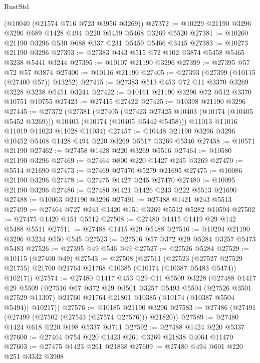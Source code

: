 \begin{lexlean}{RustStd}
\begin{coremodule}
    (@10040 (@21574 @716 @723 @3956 @3269))
@27372 := @10229 @21190 @3296 @3296 @689 @1428 @494 @220 @5459 @5468 @3269 @5520
@27381 := @10260 @21190 @3296 @530 @688 @337 @231 @5459 @5466 @3445
@27383 := @10273 @21190 @3296
@27393 := @27383 @443 @515 @72 @102 @3874 @5458 @5465 @3238 @5441 @3244
@27395 := @10107 @21190 @3296
@27399 := @27395 @57 @72 @57 @3874
@27400 := @10116 @21190
@27405 := @27393 (@27399 (@10115 (@27400 @57)) @13252)
@27415 := @27383 @513 @453 @72 @11 @3370 @3269 @3228 @3238 @5451 @3244
@27422 := @10161 @21190 @3296 @72 @512 @3370 @10751 @10755
@27423 := @27415 @27422
@27425 := @10398 @21190 @3296
@27445 := @27372
    (@27381
      (@27405
        (@27423 @27425 @10403 (@10174 (@10405 @5452 @3269)))
        @10403
        (@10174 (@10405 @5442 @5458)))
      @11013
      @11016
      @11019
      @11023
      @11028
      @11034)
@27457 := @10448 @21190 @3296 @3296 @10452 @5468 @1428 @494 @220 @3269 @5517 @3269 @5346
@27458 := @10571 @21190
@27462 := @27458 @1428 @220 @3269 @5516
@27464 := @10580 @21190 @3296
@27469 := @27464 @800 @220 @1427 @245 @3269
@27470 := @5514 @21690
@27473 := @27469 @27470 @5279 @21695
@27475 := @10086 @21190 @3296
@27478 := @27475 @1427 @245 @27470
@27480 := @10095 @21190 @3296
@27486 := @27480 @1421 @1426 @243 @222 @5513 @21690
@27488 := @10063 @21190 @3296
@27491 := @27488 @1421 @243 @5513
@27499 := @27464 @727 @243 @1420 @151 @3269 @5512 @5282 @10594
@27502 := @27475 @1420 @151 @5512
@27508 := @27480 @1415 @1419 @29 @142 @5488 @5511
@27511 := @27488 @1415 @29 @5488
@27516 := @10294 @21190 @3296 @3234 @550 @545
@27523 := @27516 @57 @372 @29 @5284 @3257 @5473 @5483
@27526 := @27395 @49 @546 @49
@27527 := @27526 @5284
@27529 := @10115 (@27400 @49)
@27543 := @27508
    (@27511
      (@27523
        (@27527 @27529 @21755)
        @21760
        @21764
        @21768
        @10385
        (@10174 (@10387 @5483 @5474))
        @10217))
@27574 := @27480
    @1417
    @453
    @29
    @11
    @5509
    @3228
    (@27488
      @1417
      @29
      @5509
      (@27516
        @67
        @372
        @29
        @3501
        @3257
        @5493
        @5504
        (@27526 @3501 @27529 @11307)
        @21760
        @21764
        @21801
        @10385
        (@10174 (@10387 @5504 @5494))
        @10217))
@27576 := @10185 @21190 @3296
@27583 := @27486 (@27491 (@27499 (@27502 (@27543 (@27574 @27576))) @21820))
@27589 := @27480 @1424 @618 @220 @198 @5337 @3711
@27592 := @27488 @1424 @220 @5337
@27600 := @27464 @754 @220 @1423 @261 @3269 @21838 @4064 @11470
@27603 := @27475 @1423 @261 @21838
@27609 := @27480 @494 @601 @220 @251 @3332 @3908

\end{coremodule}
\end{lexlean}
